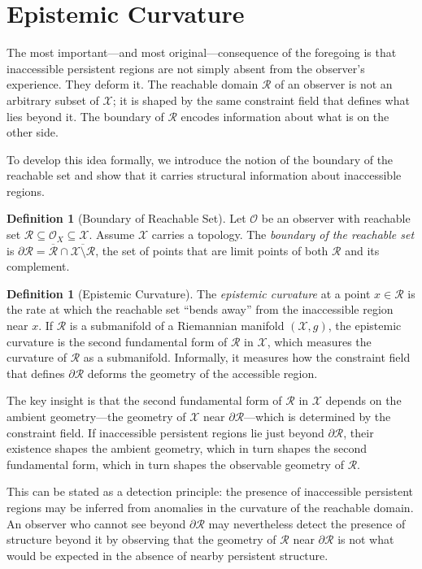 \documentclass[12pt, a4paper, oneside]{article}
\theoremstyle{plain}
\theoremstyle{definition}
\newtheorem{definition}[theorem]{Definition}
\theoremstyle{remark}
\newcommand{\X}{\mathcal{X}}
\newcommand{\Obs}{\mathcal{O}}
\newcommand{\R}{\mathcal{R}}
\begin{document}
\section{Epistemic Curvature}

The most important---and most original---consequence of the foregoing is that inaccessible persistent regions are not simply absent from the observer's experience. They deform it. The reachable domain $\R$ of an observer is not an arbitrary subset of $\X$; it is shaped by the same constraint field that defines what lies beyond it. The boundary of $\R$ encodes information about what is on the other side.

To develop this idea formally, we introduce the notion of the boundary of the reachable set and show that it carries structural information about inaccessible regions.

\begin{definition}[Boundary of Reachable Set]
Let $\Obs$ be an observer with reachable set $\R \subseteq \Obs_X \subseteq \X$. Assume $\X$ carries a topology. The \emph{boundary of the reachable set} is $\partial \R = \overline{\R} \cap \overline{\X \setminus \R}$, the set of points that are limit points of both $\R$ and its complement.
\end{definition}

\begin{definition}[Epistemic Curvature]
The \emph{epistemic curvature} at a point $x \in \R$ is the rate at which the reachable set ``bends away'' from the inaccessible region near $x$. If $\R$ is a submanifold of a Riemannian manifold $(\X, g)$, the epistemic curvature is the second fundamental form of $\R$ in $\X$, which measures the curvature of $\R$ as a submanifold. Informally, it measures how the constraint field that defines $\partial \R$ deforms the geometry of the accessible region.
\end{definition}

The key insight is that the second fundamental form of $\R$ in $\X$ depends on the ambient geometry---the geometry of $\X$ near $\partial \R$---which is determined by the constraint field. If inaccessible persistent regions lie just beyond $\partial \R$, their existence shapes the ambient geometry, which in turn shapes the second fundamental form, which in turn shapes the observable geometry of $\R$.

This can be stated as a detection principle: the presence of inaccessible persistent regions may be inferred from anomalies in the curvature of the reachable domain. An observer who cannot see beyond $\partial \R$ may nevertheless detect the presence of structure beyond it by observing that the geometry of $\R$ near $\partial \R$ is not what would be expected in the absence of nearby persistent structure.
\end{document}
